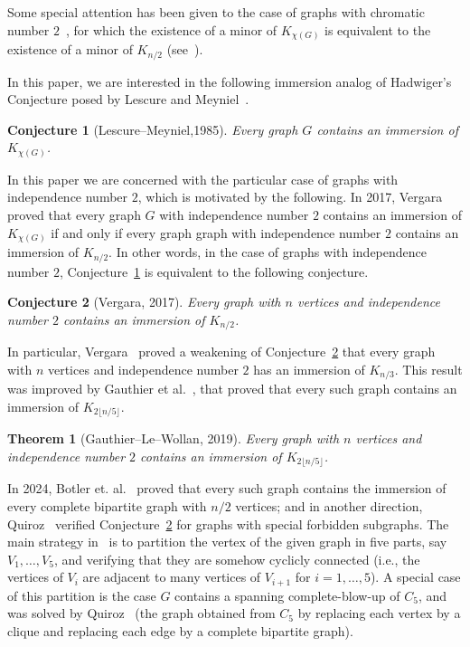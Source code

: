 \documentclass[a4paper,12pt]{article}
\newtheorem{theorem}{Theorem}
\newtheorem{conjecture}{Conjecture}
\begin{document}
Some special attention has been given to the case of graphs with chromatic number \(2\)~\cite{seymour2016hadwiger},
for which the existence of a minor of \(K_{\chi(G)}\) is equivalent to the existence of a minor of \(K_{n/2}\) (see~\cite{plummer2003special}).

In this paper, we are interested in the following immersion analog of Hadwiger's Conjecture posed by Lescure and Meyniel~\cite{lescure41problem}.

\begin{conjecture}[Lescure--Meyniel,1985]\label{conj:LescureMeyniel}
	Every graph \(G\) contains an immersion of \(K_{\chi(G)}\).
\end{conjecture}

In this paper we are concerned with the particular case of graphs with independence number \(2\),
which is motivated by the following.
In 2017, Vergara~\cite{vergara2017complete} proved that every graph \(G\) with independence number \(2\)
contains an immersion of \(K_{\chi(G)}\) if and only if every graph graph with independence number \(2\) contains an immersion of \(K_{n/2}\). 
In other words, in the case of graphs with independence number \(2\),
Conjecture~\ref{conj:LescureMeyniel} is equivalent to the following conjecture.


\begin{conjecture}[Vergara, 2017]\label{conj:vergara}
	Every graph with \(n\) vertices and independence number \(2\)
	contains an immersion of \(K_{n/2}\).
\end{conjecture}

In particular, Vergara~\cite{vergara2017complete} proved a weakening of Conjecture~\ref{conj:vergara} that every graph with \(n\) vertices and independence number \(2\)
has an immersion of \(K_{n/3}\).
This result was improved by Gauthier et al.~\cite{gauthier2019forcing},
that proved that every such graph contains an immersion of \(K_{2\lfloor n/5\rfloor}\).

\begin{theorem}[Gauthier--Le--Wollan, 2019]\label{thm:gauthier}
	Every graph with \(n\) vertices and independence number \(2\)
	contains an immersion of \(K_{2\lfloor n/5\rfloor}\).
\end{theorem}

In 2024, Botler et. al.~\cite{botler2024biclique} proved that every such graph
contains the immersion of every complete bipartite graph with \(n/2\) vertices;
and in another direction, Quiroz~\cite{quiroz2021clique} verified Conjecture~\ref{conj:vergara} for graphs with special forbidden subgraphs.
The main strategy in~\cite{botler2024biclique} is to partition the vertex of the given graph in
five parts, say \(V_1,\ldots, V_5\), and verifying that they are somehow cyclicly connected (i.e., the vertices of \(V_i\) are adjacent to many vertices of \(V_{i+1}\) for \(i=1,\ldots, 5\)). 
A special case of this partition is the case \(G\) contains a spanning complete-blow-up of \(C_5\),
and was solved by Quiroz~\cite{botler2024biclique} (the graph obtained from \(C_5\) by replacing each vertex by a clique and replacing each edge by a complete bipartite graph).
\end{document}
